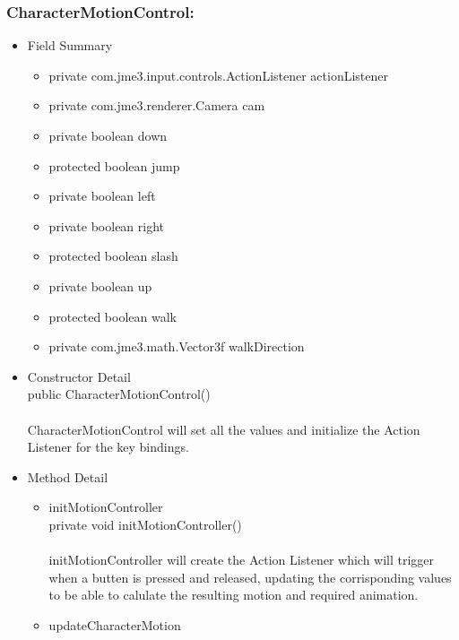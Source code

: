 \documentclass[letterpaper]{article}
\begin{document}
								\subsubsection*{CharacterMotionControl:}
								\vspace{0.1in}
									\begin{itemize}
										\item	Field Summary
												\begin{itemize}
													\item	private com.jme3.input.controls.ActionListener	actionListener 
													\item	private com.jme3.renderer.Camera	cam 
													\item	private boolean	down 
													\item	protected boolean	jump 
													\item	private boolean	left 
													\item	private boolean	right 
													\item	protected boolean	slash 
													\item	private boolean	up 
													\item	protected boolean	walk 
													\item	private com.jme3.math.Vector3f	walkDirection  
												\end{itemize}
										\item	Constructor Detail \\
												public CharacterMotionControl() \\ \\
												CharacterMotionControl will set all the values and initialize the Action Listener for the key bindings.
										\item	Method Detail 
												\begin{itemize}
													\item	initMotionController \\
															private void initMotionController() \\ \\
															initMotionController will create the Action Listener which will trigger when a butten is pressed and released, updating the corrisponding values to be able to calulate the resulting motion and required animation.
													\item	updateCharacterMotion \\

\end{itemize}
\end{itemize}
\end{document}
